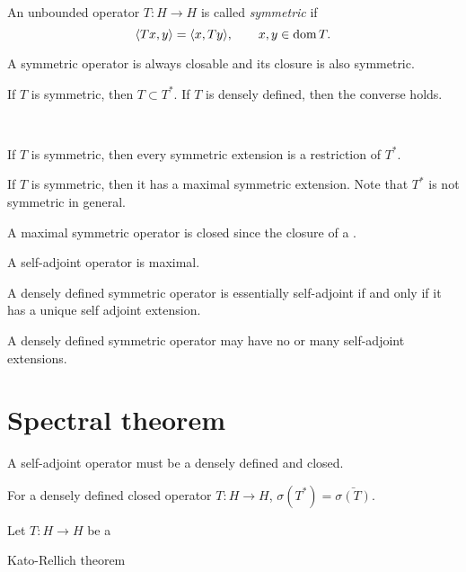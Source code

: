 \documentclass{../../large}
\begin{document}
\begin{prb}
An unbounded operator $T:H\to H$ is called \emph{symmetric} if
\[\langle Tx,y\rangle=\langle x,Ty\rangle,\qquad x,y\in\operatorname{dom} T.\]
\begin{parts}
\item A symmetric operator is always closable and its closure is also symmetric.
\item If $T$ is symmetric, then $T\subset T^*$. If $T$ is densely defined, then the converse holds.
\end{parts}
\end{prb}

\begin{prb}
\,
\begin{parts}
\item If $T$ is symmetric, then every symmetric extension is a restriction of $T^*$.
\item If $T$ is symmetric, then it has a maximal symmetric extension. Note that $T^*$ is not symmetric in general.
\item A maximal symmetric operator is closed since the closure of a .
\item A self-adjoint operator is maximal.
\item A densely defined symmetric operator is essentially self-adjoint if and only if it has a unique self adjoint extension.
\item A densely defined symmetric operator may have no or many self-adjoint extensions.
\end{parts}
\end{prb}

\begin{prb}
\end{prb}

\section{Spectral theorem}

A self-adjoint operator must be a densely defined and closed.

\begin{prb}
For a densely defined closed operator $T:H\to H$, $\sigma(T^*)=\bar{\sigma(T)}$.
\end{prb}

\begin{prb}
Let $T:H\to H$ be a 
\begin{parts}
\item
\end{parts}
\end{prb}
Kato-Rellich theorem
\end{document}
